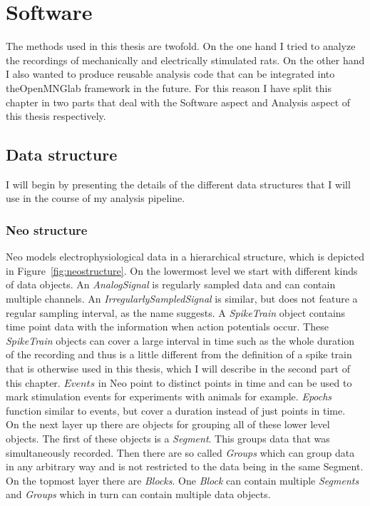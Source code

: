 \section{Software}
The methods used in this thesis are twofold. On the one hand I tried to analyze the recordings of mechanically and electrically stimulated rats. On the other hand I also wanted to produce reusable analysis code that can be integrated into theOpenMNGlab framework in the future. For this reason I have split this chapter in two parts that deal with the Software aspect and Analysis aspect of this thesis respectively.

\subsection{Data structure}
I will begin by presenting the details of the different data structures that I will use in the course of my analysis pipeline.

\subsubsection{Neo structure}
Neo models electrophysiological data in a hierarchical structure, which is depicted in Figure~\ref{fig:neostructure}. On the lowermost level we start with different kinds of data objects. An \textit{AnalogSignal} is regularly sampled data and can contain multiple channels. An \textit{IrregularlySampledSignal} is similar, but does not feature a regular sampling interval, as the name suggests. A \textit{SpikeTrain} object contains time point data with the information when action potentials occur. These \textit{SpikeTrain} objects can cover a large interval in time such as the whole duration of the recording and thus is a little different from the definition of a spike train that is otherwise used in this thesis, which I will describe in the second part of this chapter. 
$Events$ in Neo point to distinct points in time and can be used to mark stimulation events for experiments with animals for example. \textit{Epochs} function similar to events, but cover a duration instead of just points in time.\\
On the next layer up there are objects for grouping all of these lower level objects. The first of these objects is a \textit{Segment}. This groups data that was simultaneously recorded. Then there are so called \textit{Groups} which can group data in any arbitrary way and is not restricted to the data being in the same Segment. On the topmost layer there are \textit{Blocks}. One \textit{Block} can contain multiple \textit{Segments} and \textit{Groups} which in turn can contain multiple data objects.\\


